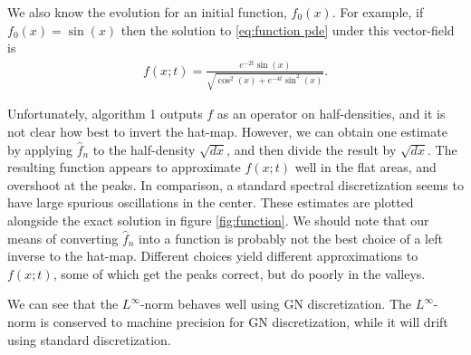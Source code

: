 \documentclass[12pt]{amsart}
\begin{document}
We also know the evolution for an initial function, $f_{0}(x)$.
For example, if $f_{0}(x) = \sin(x)$ then the solution to \eqref{eq:function pde} under this vector-field is
\begin{align*}
	f(x;t) = \frac{ e^{-2t} \sin(x) }{ \sqrt{ \cos^{2}(x) + e^{-4t} \sin^{2}(x) } }.
\end{align*}

Unfortunately, algorithm 1 outputs $f$ as an operator on half-densities, and it is not clear how best to invert the hat-map.
However, we can obtain one estimate by applying $\hat{f}_{n}$ to the half-density $\sqrt{dx}$, and then divide the result by $\sqrt{dx}$.
The resulting function appears to approximate $f(x;t)$ well in the flat areas, and overshoot at the peaks.
In comparison, a standard spectral discretization seems to have large spurious oscillations in the center.
These estimates are plotted alongside the exact solution in figure \ref{fig:function}.
We should note that our means of converting $\hat{f}_{n}$ into a function is probably not the best choice of a left inverse to the hat-map.
Different choices yield different approximations to $f(x;t)$, some
of which get the peaks correct, but do poorly in the valleys.

We can see that the $L^{\infty}$-norm behaves well using GN discretization.
The $L^{\infty}$-norm is conserved to machine precision for GN discretization, while it will drift using standard discretization.
\end{document}
